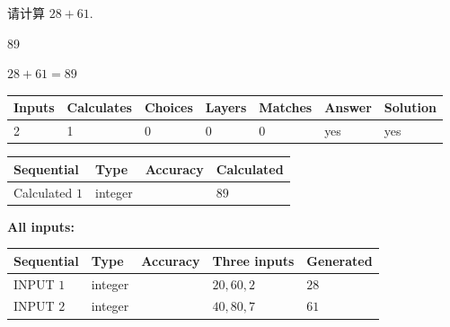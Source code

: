 \documentclass{ctexart}
\begin{document}
  
 
请计算 $ %
28 +  %
61 $.
 
 
 
\noindent{}
 
 

89
 
 
\noindent{}
 
 

 
 
 
\noindent{}
 
 

$ %
28 +  %
61=   %
89$
 
 
\noindent{}
 
 

 
   
   
   
   
\noindent\begin{tabular}{|l|l|l|l|l|l|l|}
 \hline
Inputs & Calculates & Choices & Layers & Matches & Answer & Solution \\ \hline
 2  & 
 1  & 
 0
  & 
 0  & 
 0  & 
  yes & 
  yes 
  \\ \hline
 \end{tabular}
   
   
   
   
\noindent{}
   
   
  
  
\noindent\begin{tabular}{|l|l|l|l|}
\hline
 Sequential & Type & Accuracy & Calculated \\ 
\hline
 
 
  Calculated $  1 $ & integer &  & 
  $ 89 $ 
 \\  \hline  
 \end{tabular}
   
   
   
   
\noindent\vspace{0.1in}\hspace{-0.08in} {\textbf{\Large{All inputs: }}}
   
   
  
  
\noindent\begin{tabular}{|l|l|l|l|l|}
\hline
 Sequential & Type & Accuracy & Three inputs & Generated \\ 
\hline
 
 
  INPUT $  1 $ & integer &  & $
 20
 , 
 60
 , 
 2
 $ & $ 28 $ 
 \\  \hline  
 
 
  INPUT $  2 $ & integer &  & $
 40
 , 
 80
 , 
 7
 $ & $ 61 $ 
 \\  \hline  
 \end{tabular}
   
\end{document}
